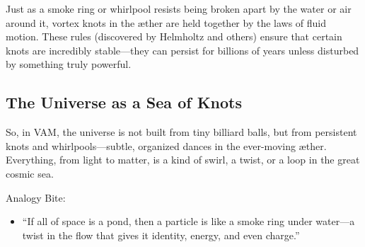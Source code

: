 Just as a smoke ring or whirlpool resists being broken apart by the water or air around it, vortex knots in the æther are held together by the laws of fluid motion. These rules (discovered by Helmholtz and others) ensure that certain knots are incredibly stable—they can persist for billions of years unless disturbed by something truly powerful.


\subsection*{The Universe as a Sea of Knots}

So, in VAM, the universe is not built from tiny billiard balls, but from persistent knots and whirlpools—subtle, organized dances in the ever-moving æther. Everything, from light to matter, is a kind of swirl, a twist, or a loop in the great cosmic sea.


Analogy Bite:


\begin{itemize}

\item
“If all of space is a pond, then a particle is like a smoke ring under water—a twist in the flow that gives it identity, energy, and even charge.”




\end{itemize}
